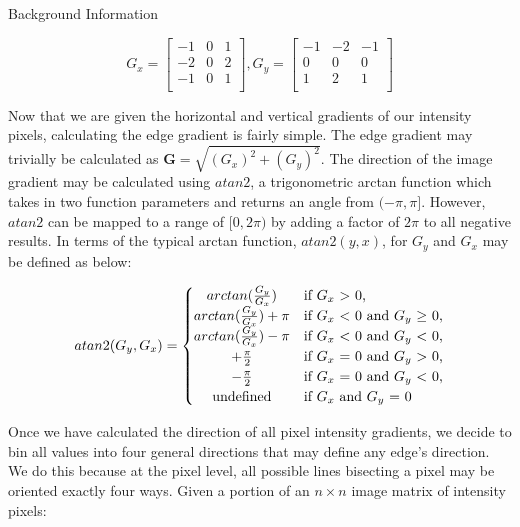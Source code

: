 \documentclass[a4paper,12pt]{article}
\begin{document}
\begin{section}{Background Information}
\singlespacing
\begin{center}
\[G_x = 
\begin{bmatrix}
-1 & 0 & 1\\
-2 & 0 & 2\\
-1 & 0 & 1\\
\end{bmatrix}
, G_y =
\begin{bmatrix}
-1 & -2 & -1\\
0 & 0 & 0\\
1 & 2 & 1\\
\end{bmatrix}
\]
\end{center}
\doublespacing

Now that we are given the horizontal and vertical gradients of our intensity pixels, calculating the edge gradient is fairly simple.
The edge gradient may trivially be calculated as $\textbf{G} = \sqrt{(G_x)^2 + (G_y)^2}$. 
The direction of the image gradient may be calculated using $atan2$, a trigonometric arctan function which takes in two function parameters and returns an angle from $(-\pi,\pi]$.
However, $atan2$ can be mapped to a range of $[0,2\pi)$ by adding a factor of $2\pi$ to all negative results.
In terms of the typical arctan function, $atan2(y,x)$, for $G_y$ and $G_x$ may be defined as below:

\singlespacing
\begin{center}
\[
atan2(G_y, G_x) = \left\{\def\arraystretch{1.2}%
  \begin{array}{@{}c@{\quad}l@{}}
	arctan(\frac{G_y}{G_x}) & \text{if $G_x$ $>$ 0,}\\
	arctan(\frac{G_y}{G_x}) + \pi & \text{if $G_x$ $<$ 0 and $G_y$ $\geq$ 0,}\\  
	arctan(\frac{G_y}{G_x}) - \pi & \text{if $G_x$ $<$ 0 and $G_y$ $<$ 0,}\\
	+\frac{\pi}{2} & \text{if $G_x$ = 0 and $G_y$ $>$ 0,}\\
	-\frac{\pi}{2} & \text{if $G_x$ = 0 and $G_y$ $<$ 0,}\\
	\text{undefined} & \text{if $G_x$ and $G_y$ = 0}\\
  \end{array}\right.
\]
\end{center}
\doublespacing

Once we have calculated the direction of all pixel intensity gradients, we decide to bin all values into four general directions that may define any edge's direction.
We do this because at the pixel level, all possible lines bisecting a pixel may be oriented exactly four ways.
Given a portion of an $n\times n$ image matrix of intensity pixels:


\end{section}
\end{document}
